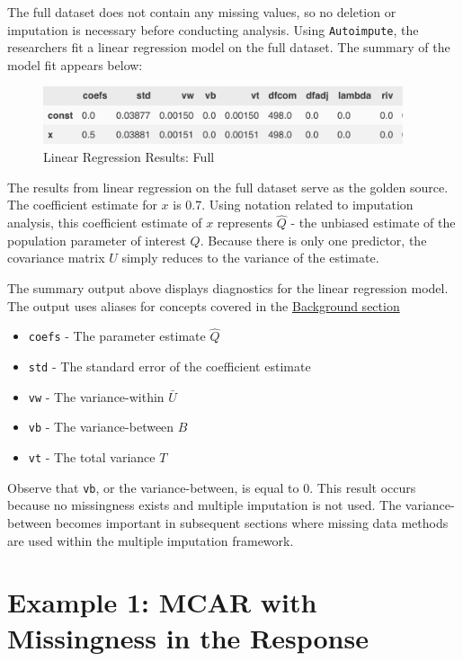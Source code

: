 \documentclass[12pt,oneside]{chicagocapstone}
\providecommand{\tightlist}{%
  \setlength{\itemsep}{0pt}\setlength{\parskip}{0pt}}
\begin{document}
The full dataset does not contain any missing values, so no deletion or
imputation is necessary before conducting analysis. Using
\texttt{Autoimpute}, the researchers fit a linear regression model on
the full dataset. The summary of the model fit appears below:
\begin{figure}

{\centering \includegraphics[width=400px]{figure/full-regression} 

}

\caption{Linear Regression Results: Full}\label{fig:full-regression}
\end{figure}
The results from linear regression on the full dataset serve as the
golden source. The coefficient estimate for \(x\) is 0.7. Using notation
related to imputation analysis, this coefficient estimate of \(x\)
represents \(\hat Q\) - the unbiased estimate of the population
parameter of interest \(Q\). Because there is only one predictor, the
covariance matrix \(U\) simply reduces to the variance of the estimate.

The summary output above displays diagnostics for the linear regression
model. The output uses aliases for concepts covered in the
\protect\hyperlink{background}{Background section}
\begin{itemize}
\tightlist
\item
  \texttt{coefs} - The parameter estimate \(\hat Q\)
\item
  \texttt{std} - The standard error of the coefficient estimate
\item
  \texttt{vw} - The variance-within \(\bar U\)
\item
  \texttt{vb} - The variance-between \(B\)
\item
  \texttt{vt} - The total variance \(T\)
\end{itemize}
Observe that \texttt{vb}, or the variance-between, is equal to 0. This
result occurs because no missingness exists and multiple imputation is
not used. The variance-between becomes important in subsequent sections
where missing data methods are used within the multiple imputation
framework.

\section*{Example 1: MCAR with Missingness in the
Response}\label{example-1-mcar-with-missingness-in-the-response}
\end{document}
